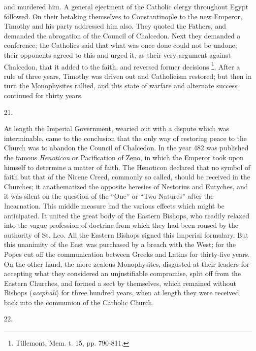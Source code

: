 and murdered him. A general ejectment of the Catholic clergy
throughout Egypt followed. On their betaking themselves to
Constantinople to the new Emperor, Timothy and his party addressed him
also. They quoted the Fathers, and demanded the abrogation of the
Council of Chalcedon. Next they demanded a conference; the Catholics
said that what was once done could not be undone; their opponents
agreed to this and urged it, as their very argument against Chalcedon,
that it added to the faith, and reversed former decisions \footnote{Tillemont, Mem. t. 15, pp. 790-811.}. After a rule of three years, Timothy was driven out and
Catholicism restored; but then in turn the Monophysites rallied, and
this state of warfare and alternate success continued for thirty
years.

21.

At length the Imperial Government, wearied out with a dispute which
was interminable, came to the conclusion that the only way of
restoring peace to the Church was to abandon the Council of Chalcedon.
In the year 482 was published the famous \emph{Henoticon} or
Pacification of Zeno, in which the Emperor took upon himself to
determine a matter of faith. The Henoticon declared that no symbol of
faith but that of the Nicene Creed, commonly so called, should be
received in the Churches; it anathematized the opposite heresies of
Nestorius and Eutyches, and it was silent on the question of the
``One'' or ``Two Natures'' after the Incarnation. This
middle measure had the various effects which might be anticipated. It
united the great body of the Eastern Bishops, who readily relaxed into
the vague profession of doctrine from which they had been roused by
the authority of St. Leo. All the Eastern Bishops signed this Imperial
formulary. But this unanimity of the East was purchased by a breach
with the West; for the Popes cut off the communication between Greeks
and Latins for thirty-five years. On the other hand, the more zealous
Monophysites, disgusted at their leaders for accepting what they
considered an unjustifiable compromise, split off from the Eastern
Churches, and formed a sect by themselves, which remained without
Bishops (\emph{acephali}) for three hundred years, when at length they
were received back into the communion of the Catholic Church.

22.

